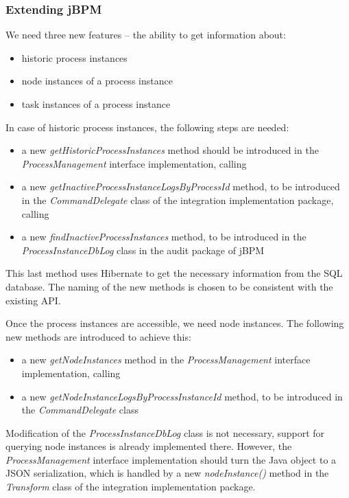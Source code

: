 \subsubsection*{Extending jBPM}

We need three new features -- the ability to get information about:

\begin{itemize}
\item historic process instances
\item node instances of a process instance
\item task instances of a process instance
\end{itemize}

In case of historic process instances, the following steps are needed:

\begin{itemize}
\item a new \emph{getHistoricProcessInstances} method should be introduced in the \emph{ProcessManagement} interface implementation, calling
\item a new \emph{getInactiveProcessInstanceLogsByProcessId} method, to be introduced in the \emph{CommandDelegate} class of the integration implementation package, calling
\item a new \emph{findInactiveProcessInstances} method, to be introduced in the \emph{ProcessInstanceDbLog} class in the audit package of jBPM
\end{itemize}

This last method uses Hibernate to get the necessary information from the SQL
database. The naming of the new methods is chosen to be consistent with the
existing API.

Once the process instances are accessible, we need node instances. The
following new methods are introduced to achieve this:

\begin{itemize}
\item a new \emph{getNodeInstances} method in the \emph{ProcessManagement} interface implementation, calling
\item a new \emph{getNodeInstanceLogsByProcessInstanceId} method, to be introduced in the \emph{CommandDelegate} class
\end{itemize}

Modification of the \emph{ProcessInstanceDbLog} class is not necessary, support
for querying node instances is already implemented there. However, the
\emph{ProcessManagement} interface implementation should turn the Java object
to a JSON serialization, which is handled by a new \emph{nodeInstance()} method
in the \emph{Transform} class of the integration implementation package.

